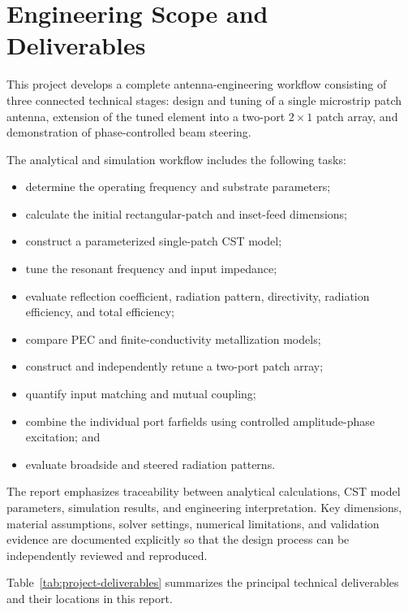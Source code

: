 \section{Engineering Scope and Deliverables}
\label{sec:engineering-scope}

This project develops a complete antenna-engineering workflow consisting of three connected
technical stages: design and tuning of a single microstrip patch antenna, extension of the tuned
element into a two-port \(2\times1\) patch array, and demonstration of phase-controlled beam
steering.

The analytical and simulation workflow includes the following tasks:
\begin{itemize}
    \item determine the operating frequency and substrate parameters;
    \item calculate the initial rectangular-patch and inset-feed dimensions;
    \item construct a parameterized single-patch CST model;
    \item tune the resonant frequency and input impedance;
    \item evaluate reflection coefficient, radiation pattern, directivity, radiation efficiency,
    and total efficiency;
    \item compare PEC and finite-conductivity metallization models;
    \item construct and independently retune a two-port patch array;
    \item quantify input matching and mutual coupling;
    \item combine the individual port farfields using controlled amplitude-phase excitation; and
    \item evaluate broadside and steered radiation patterns.
\end{itemize}

The report emphasizes traceability between analytical calculations, CST model parameters,
simulation results, and engineering interpretation. Key dimensions, material assumptions, solver
settings, numerical limitations, and validation evidence are documented explicitly so that the
design process can be independently reviewed and reproduced.

Table~\ref{tab:project-deliverables} summarizes the principal technical deliverables and their
locations in this report.

